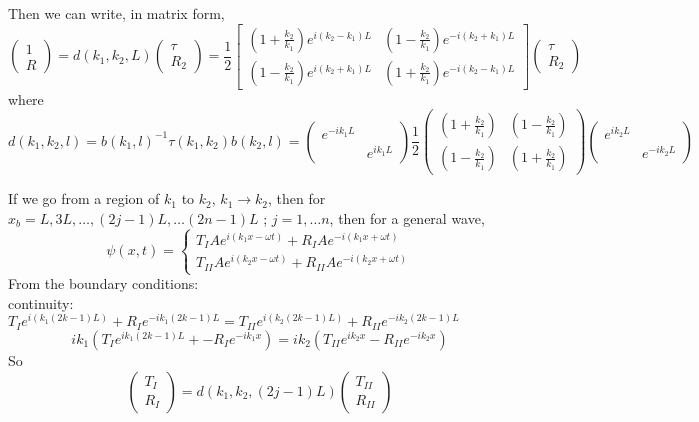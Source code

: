 \documentclass[twoside, 10pt]{amsart}
\begin{document}
Then we can write, in matrix form, 
\[
\left( \begin{matrix} 1 \\ R \end{matrix} \right) = d(k_1,k_2,L) \left( \begin{matrix} \tau \\ R_2 \end{matrix} \right) = \frac{1}{2} \left[ \begin{matrix} \left( 1 + \frac{k_2}{k_1} \right) e^{i (k_2 - k_1 ) L } & \left( 1 - \frac{k_2}{k_1} \right) e^{-i (k_2 + k_1 ) L } \\ \left( 1 - \frac{k_2}{k_1 } \right) e^{ i (k_2 + k_1 ) L } & \left( 1 + \frac{k_2}{k_1 } \right) e^{-i ( k_2 - k_1 ) L } \end{matrix} \right] \left( \begin{matrix} \tau \\ R_2 \end{matrix} \right)
\]
where
\[
d(k_1, k_2, l) = b(k_1, l)^{-1} \tau(k_1,k_2) b(k_2,l) = \left( \begin{matrix} e^{-ik_1 L} & \\ & e^{ik_1 L } \end{matrix} \right) \frac{1}{2} \left( \begin{matrix} \left( 1 + \frac{k_2}{k_1} \right) & \left( 1 - \frac{k_2}{k_1} \right) \\ \left( 1 - \frac{k_2}{k_1} \right) & \left( 1 + \frac{k_2}{k_1} \right) \end{matrix} \right) \left( \begin{matrix} e^{ik_2 L } & \\ & e^{-ik_2 L } \end{matrix} \right)
\]

If we go from a region of $k_1$ to $k_2$, $k_1 \to k_2$, then for $x_b = L, 3L, \dots, (2j-1)L , \dots (2n-1)L$ ; \quad $j=1, \dots n$, then for a general wave,
\[
\psi(x,t) = \begin{cases} T_I A e^{ i (k_1 x - \omega t)} + R_I A e^{-i (k_1 x + \omega t) } \\ T_{II} A e^{ i ( k_2 x - \omega t ) } + R_{II} A e^{ -i (k_2 x + \omega t) } \end{cases}
\]  
From the boundary conditions: \\
continuity: $ T_{I} e^{i (k_1 ( 2k-1)L ) } + R_I e^{-ik_1 ( 2k-1)L } = T_{II} e^{i (k_2 (2k-1) L )} + R_{II} e^{-ik_2(2k-1) L } $
\[
ik_1 (T_I e^{ik_1 ( 2k-1)L } + -R_I e^{-ik_1 x } ) = ik_2 (T_{II} e^{ik_2 x} - R_{II} e^{-ik_2 x} )
\]
So 
\[
\left( \begin{matrix} T_I \\ R_I \end{matrix} \right) = d(k_1,k_2,(2j-1)L) \left( \begin{matrix} T_{II} \\ R_{II} \end{matrix} \right)
\]
\end{document}

